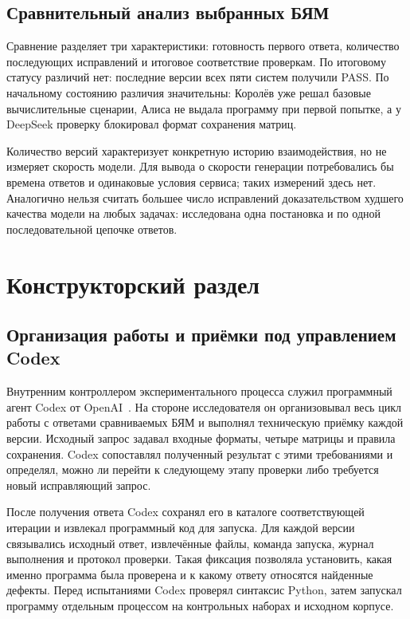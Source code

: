 \section{Сравнительный анализ выбранных БЯМ}
Сравнение разделяет три характеристики: готовность первого ответа, количество последующих исправлений и итоговое соответствие проверкам. По итоговому статусу различий нет: последние версии всех пяти систем получили PASS. По начальному состоянию различия значительны: Королёв уже решал базовые вычислительные сценарии, Алиса не выдала программу при первой попытке, а у DeepSeek проверку блокировал формат сохранения матриц.

Количество версий характеризует конкретную историю взаимодействия, но не измеряет скорость модели. Для вывода о скорости генерации потребовались бы времена ответов и одинаковые условия сервиса; таких измерений здесь нет. Аналогично нельзя считать большее число исправлений доказательством худшего качества модели на любых задачах: исследована одна постановка и по одной последовательной цепочке ответов.

\chapter{Конструкторский раздел}
\section{Организация работы и приёмки под управлением Codex}
\label{sec:codex}
Внутренним контроллером экспериментального процесса служил программный агент Codex от OpenAI~\cite{codex}. На стороне исследователя он организовывал весь цикл работы с ответами сравниваемых БЯМ и выполнял техническую приёмку каждой версии. Исходный запрос задавал входные форматы, четыре матрицы и правила сохранения. Codex сопоставлял полученный результат с этими требованиями и определял, можно ли перейти к следующему этапу проверки либо требуется новый исправляющий запрос.

После получения ответа Codex сохранял его в каталоге соответствующей итерации и извлекал программный код для запуска. Для каждой версии связывались исходный ответ, извлечённые файлы, команда запуска, журнал выполнения и протокол проверки. Такая фиксация позволяла установить, какая именно программа была проверена и к какому ответу относятся найденные дефекты. Перед испытаниями Codex проверял синтаксис Python, затем запускал программу отдельным процессом на контрольных наборах и исходном корпусе.

